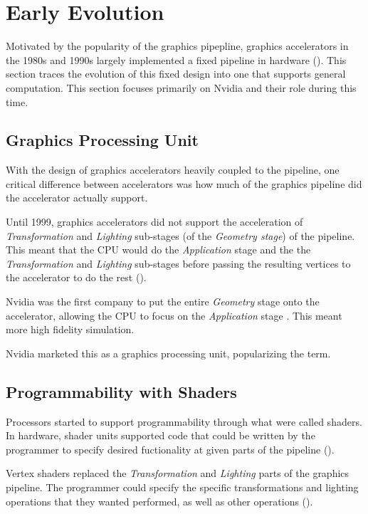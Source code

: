 \chapter{Early Evolution}

Motivated by the popularity of the graphics pipepline, graphics accelerators
in the 1980s and 1990s largely implemented a fixed pipeline in hardware (\cite{mcclanahan2010history}). This section
traces the evolution of this fixed design into one that supports general computation.
This section focuses primarily on Nvidia and their role during this time.

\section{Graphics Processing Unit}

With the design of graphics accelerators heavily coupled to the pipeline,
one critical difference between accelerators was how much of the
graphics pipeline did the accelerator actually support.

Until 1999, graphics accelerators did not support the acceleration of
\textit{Transformation} and \textit{Lighting} sub-stages (of the
\textit{Geometry stage}) of the pipeline.
This meant that the CPU would do the \textit{Application} stage and the
the \textit{Transformation} and \textit{Lighting} sub-stages before passing
the resulting vertices to the accelerator to do the rest (\cite{mcclanahan2010history}).

Nvidia was the first company to put the entire \textit{Geometry} stage
onto the accelerator, allowing the CPU to focus on the \textit{Application}
stage \cite{nvidia256}. This meant more high fidelity simulation.

Nvidia marketed this as a graphics processing unit, popularizing the term.

\section{Programmability with Shaders}

Processors started to support programmability through what were called shaders.
In hardware, shader units supported code that could be written by the programmer
to specify desired fuctionality at given parts of the pipeline (\cite{mcclanahan2010history}).

Vertex shaders replaced the \textit{Transformation} and \textit{Lighting} parts
of the graphics pipeline. The programmer could specify the specific 
transformations and lighting operations that they wanted performed, as well
as other operations (\cite{lsu}). 

